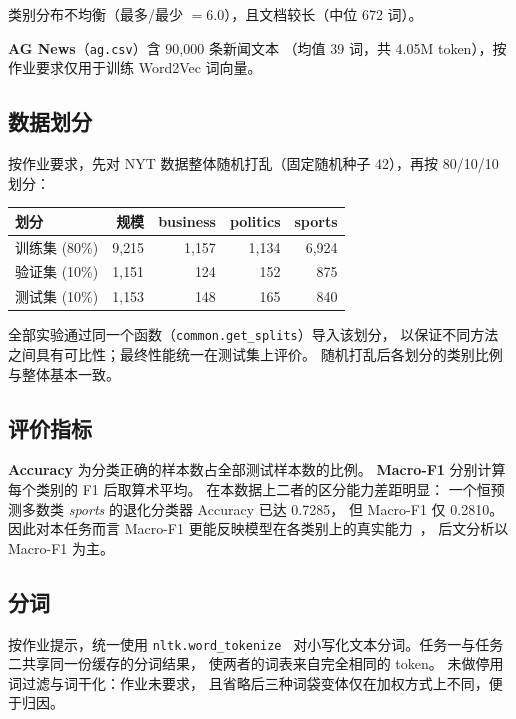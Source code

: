 \documentclass[10pt,twocolumn,letterpaper]{article}
\begin{document}
类别分布不均衡（最多/最少 $=6.0$），且文档较长（中位 672 词）。

\textbf{AG News}（\texttt{ag.csv}）含 90{,}000 条新闻文本
（均值 39 词，共 4.05M token），按作业要求仅用于训练 Word2Vec 词向量。

\subsection{数据划分}

按作业要求，先对 NYT 数据整体随机打乱（固定随机种子 42），再按 80/10/10 划分：

\begin{center}\small
\begin{tabular}{lrrrr}
\toprule
划分 & 规模 & business & politics & sports \\
\midrule
训练集 (80\%) & 9{,}215 & 1{,}157 & 1{,}134 & 6{,}924 \\
验证集 (10\%) & 1{,}151 & 124 & 152 & 875 \\
测试集 (10\%) & 1{,}153 & 148 & 165 & 840 \\
\bottomrule
\end{tabular}
\end{center}

全部实验通过同一个函数（\texttt{common.get\_splits}）导入该划分，
以保证不同方法之间具有可比性；最终性能统一在测试集上评价。
随机打乱后各划分的类别比例与整体基本一致。

\subsection{评价指标}

\textbf{Accuracy} 为分类正确的样本数占全部测试样本数的比例。
\textbf{Macro-F1} 分别计算每个类别的 F1 后取算术平均。
在本数据上二者的区分能力差距明显：
一个恒预测多数类 \emph{sports} 的退化分类器 Accuracy 已达 0.7285，
但 Macro-F1 仅 0.2810。
因此对本任务而言 Macro-F1 更能反映模型在各类别上的真实能力~\cite{he2008learning}，
后文分析以 Macro-F1 为主。

\subsection{分词}

按作业提示，统一使用 \texttt{nltk.word\_tokenize}~\cite{bird2009nltk}
对小写化文本分词。任务一与任务二共享同一份缓存的分词结果，
使两者的词表来自完全相同的 token。
未做停用词过滤与词干化：作业未要求，
且省略后三种词袋变体仅在加权方式上不同，便于归因。
\end{document}
